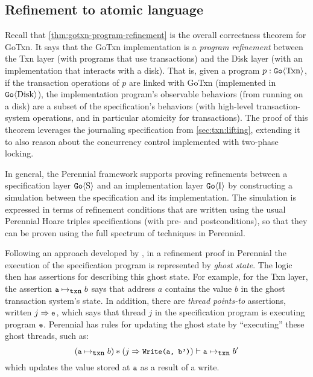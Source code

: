 \subsection{Refinement to atomic language}
\label{sec:txn:refinement}

\newcommand{\txnmapsto}{\mapsto_{\cc{txn}}}
\newcommand{\thdmapsto}{\Rightarrow}

Recall that \cref{thm:gotxn-program-refinement} is the overall correctness
theorem for GoTxn. It says that the GoTxn implementation is a \emph{program
refinement} between the Txn layer (with programs that use transactions) and the
Disk layer (with an implementation that interacts with a disk).
That is, given a program
$p : \mathtt{Go}\langle \mathrm{Txn} \rangle$, if the transaction operations of $p$ are linked with
GoTxn (implemented in $\mathtt{Go}\langle \mathrm{Disk} \rangle$), the implementation program's
observable behaviors (from running on a disk) are a subset of the
specification's behaviors (with high-level transaction-system operations, and in
particular atomicity for transactions). The proof of this theorem leverages the
journaling specification from \cref{sec:txn:lifting}, extending it to also
reason about the concurrency control implemented with two-phase locking.

In general, the Perennial framework supports proving refinements between a
specification layer $\mathtt{Go}\langle \mathrm{S} \rangle$ and an implementation layer $\mathtt{Go}\langle \mathrm{I} \rangle$ by constructing
a simulation between the specification and its implementation. The simulation is
expressed in terms of refinement conditions that are written using the usual
Perennial Hoare triples specifications (with pre- and postconditions),
so that they can be proven using the full spectrum of techniques in Perennial.

Following an
approach developed by \citet{turon:caresl}, in a refinement proof in Perennial the execution of the specification
program is represented by \emph{ghost state}. The logic then has assertions for
describing this ghost state.  For example, for the Txn layer, the assertion $\cc{a}
\txnmapsto b$ says that address $a$ contains the value $b$ in the ghost
transaction system's state. In addition, there are \emph{thread points-to}
assertions, written $j \thdmapsto \cc{e}$, which says that thread $j$ in the
specification program is executing program $\cc{e}$. Perennial has rules
for updating the ghost state by ``executing'' these ghost threads, such as:
\[ (\cc{a} \txnmapsto b) \sep (j \thdmapsto \cc{Write(a, b')}) \vdash
\cc{a} \txnmapsto b' \]
which updates the value stored at $\cc{a}$ as a result of a write.

